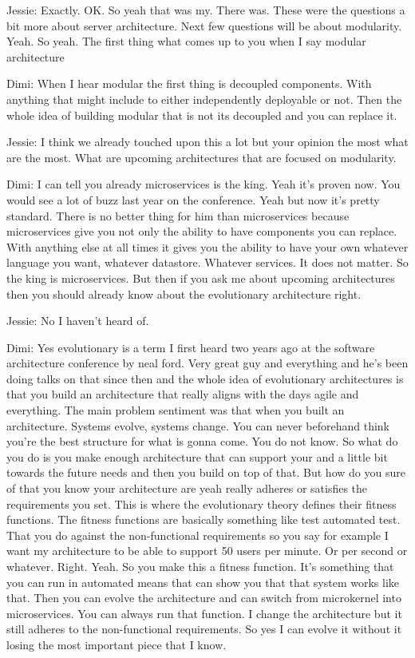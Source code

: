 Jessie: Exactly. OK. So yeah that was my. There was. These were the questions a bit more about server architecture. Next few questions will be about modularity. Yeah. So yeah. The first thing what comes up to you when I say modular architecture

Dimi: When I hear modular the first thing is decoupled components. With anything that might include to either independently deployable or not. Then the whole idea of building modular that is not its decoupled and you can replace it.

Jessie: I think we already touched upon this a lot but your opinion the most what are the most. What are upcoming architectures that are focused on modularity.

Dimi: I can tell you already microservices is the king. Yeah it's proven now. You would see a lot of buzz last year on the conference. Yeah but now it's pretty standard. There is no better thing for him than microservices because microservices give you not only the ability to have components you can replace. With anything else at all times it gives you the ability to have your own whatever language you want, whatever datastore. Whatever services. It does not matter. So the king is microservices. But then if you ask me about upcoming architectures then you should already know about the evolutionary architecture right.

Jessie: No I haven't heard of.

Dimi: Yes evolutionary is a term I first heard two years ago at the software architecture conference by neal ford. Very great guy and everything and he's been doing talks on that since then and the whole idea of evolutionary architectures is that you build an architecture that really aligns with the days agile and everything. The main problem sentiment was that when you built an architecture. Systems evolve, systems change. You can never beforehand think you're the best structure for what is gonna come. You do not know. So what do you do is you make enough architecture that can support your and a little bit towards the future needs and then you build on top of that. But how do you sure of that you know your architecture are yeah really adheres or satisfies the requirements you set. This is where the evolutionary theory defines their fitness functions. The fitness functions are basically something like test automated test. That you do against the non-functional requirements so you say for example I want my architecture to be able to support 50 users per minute. Or per second or whatever. Right. Yeah. So you make this a fitness function. It's something that you can run in automated means that can show you that that system works like that. Then you can evolve the architecture and can switch from microkernel into microservices. You can always run that function. I change the architecture but it still adheres to the non-functional requirements. So yes I can evolve it without it losing the most important piece that I know.

